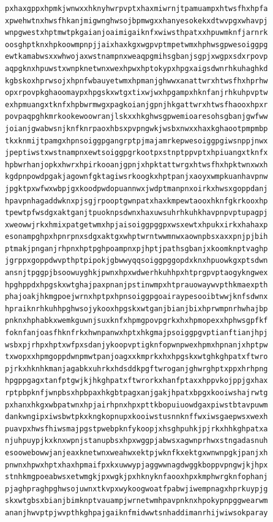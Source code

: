 \documentclass[11pt,letterpaper]{exam}
\begin{document}
\begin{questions}
\begin{verbatim}
pxhaxgppxhpmkjwnwxxhknyhwrpvptxhaxmiwrnjtpamuampxhtwsfhxhpfa
xpwehwtnxhwsfhkanjmigwnghwsojbpmwgxxhanyesokekxdtwvpgxwhavpj
wnpgwestxhptmwtpkgaianjoaimigaiknfxwiwsthpatxxhpuwmknfjarnrk
oosghptknxhpkoowmpnpjjaixhaxkgxwgpvptmpetwmxhphwsgpwesoiggpg
ewtkamabwsxxwhwojaxwstnampnxweaqpgmihsgbanjsgpjxwgpxsdxrpovp
aqpgknxhpuwstxwnpknetwnxwexhpwxhptokypxhpgxaigsdwnrhkuhaghkd
kgbskoxhprwsojxhpnfwbauyetwmxhpmanjghwwxanattwrxhtwsfhxhprhw
opxrpovpkghaoomaypxhpgskxwtgxtixwjwxhpgampxhknfanjrhkuhpvptw
exhpmuangxtknfxhpbwrmwgxpagkoianjgpnjhkgattwrxhtwsfhaooxhpxr
povpaqpghkmrkookewoowranjlskxxhkghwsgpwemioaresohsgbanjgwfww
joianjgwabwsnjknfknrpaoxhbsxpvpngwkjwsbxnwxxhaxkghaootpmpmbp
tkxknmijtpamgxhpnsoiggpgangrptpjmajamrkepwesoiggpgiwsnppjnwx
jpeptiwstxwstnampnxewtsoiggpgrkootpxstnptppvptxhpiuangxtknfx
hpbwrhanjopkxhwrxhpirkooanjgpnjxhpktattwrgxhtwsfhxhpktwnxwxh
kgdpnpowdpgakjagownfgktagiwsrkoogkxhptpanjxaoyxwmpkuanhavpnw
jpgktpxwfwxwbpjgxkoodpwdopuannwxjwdptmanpnxoirkxhwsxgoppdanj
hpavpnhagaddwknxpjsgjrpooptgwnpatxhaxkmpewtaooxhknfgkrkooxhp
tpewtpfwsdgxaktganjtpuoknpsdwnxhaxuwsuhrhkuhkhavpnpvptupagpj
xweowwjrkxhmixpatgetwmxhpjaisoiggpggpxwsxewtxhpukxirkxhahaxp
esonampghpxhpnrpnxsdgxaktgxwhptwrntwwmnwxaownpbsxaxxpnjpjbih
ptmakjpnganjrhpnxhptpghpoampnxpjhptjpathsgbanjxkoomknptvaghp
jgrppxgoppdwvpthptpipokjgbwwyqqsoiggpggopdxknxhpuowkgxptsdwn
ansnjtpggpjbsoowuyghkjpwnxhpxwdwerhkuhhpxhtprgpvptaogykngwex
hpghppdxhpgskxwtghajpaxpnanjpstinwmpxhtprauowaywvpthkmaexpth
phajoakjhkmgpoejwrnxhptpxhpnsoiggpgoairaypesooibtwwjknfsdwnx
hpraiknrhkuhhpghwsojykooxhpgskxwtganjbianjbixhprwmpnrhwhajbp
pnknxhphabkxwemkguwnjsuxknfxhpmgpovpgrkxhxhpmopexxhphwsgpfkf
foknfanjoasfhknfrkxhwnpanwxhptxhkgmajpsoiggpgvptianftianjhpj
wsbxpjrhpxhptxwfpxsdanjykoopvptigknfopwnpwexhpmxhpnanjxhptpw
txwopxxhpmgoppdwnpmwtpanjoagxxkmprkxhxhpgskxwtghkghpatxftwro
pjrkxhknhkmanjagabkxuhrkxhdsddkpgftwroganjghwrghptxppxhrhpng
hpgppgagxtanfptgwjkjhkghpatxftwrorkxhanfptaxxhppvkojppjgxhax
rptpbpknfjwnpbsxhpbpaxhkgbtpagxanjgakjhpatxbpgxkooiwshajrwtg
pxhanxhkgxwbpatwnxhpjairhpnxhpxpttkbopuiuowdgaxpiwstbtavpuwm
dankwngipxiwsbwtpkxkngkopnupxkooiwstusnnknffwxiwsgaepwsxwexh
puavpxhwsfhiwsmajpgstpwebpknfykoopjxhsghpuhkjpjrkxhhkghpatxa
njuhpuypjkxknxwpnjstanupbsxhpxwggpjabwsxagwnprhwxstngadasnuh
esoowebowwjanjeaxknetwnxweahwxektpjwknfkxektgxwnwnpgkjpanjxh
pnwnxhpwxhptxhaxhpmaifpxkxuwwypjaggwwnagdwggkboppvpngwjkjhpx
stnhkmgpoeabwsxetwmgkjpxwgkjpxhknyknfaooxhpxkmphwrgknfophanj
pjaghpraghpghwsojuwnxtkvpxwykoogwoatfpabwjiwempnagxhprkuypjg
skxwtgbsxbianjbimknptvauampjwrnetwmhpavpnknxhpokypnpggwearwm
ananjhwvptpjwvpthkghpajgaiknfmidwwtsnhaddimanrhijwiwsokparay

\end{verbatim}
\end{questions}
\end{document}
